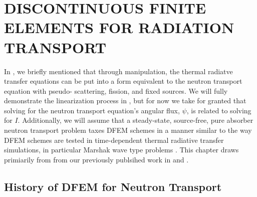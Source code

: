 %
%
%


\chapter{\uppercase {Discontinuous Finite Elements for Radiation Transport}}
\label{sec:chapter2_constant_xs}

In , we briefly mentioned that through manipulation, the thermal radiatve transfer equations can be put into a form equivalent to the 
neutron transport equation with pseudo- scattering, fission, and fixed sources.  
We will fully demonstrate the linearization process in , but for now we 
take for granted that solving for the neutron transport equation's angular flux, $\psi$, is related to solving  for $I$.
Additionally, we will assume that a steady-state, source-free, pure absorber neutron transport problem taxes DFEM schemes in a manner similar to the way DFEM schemes are tested
in time-dependent thermal radiative transfer simulations, in particular Marshak wave type problems \cite{ober_shadid}.  This chapter draws primiarily from
from our previously publsihed work in \cite{mc_2013} and \cite{part_1_paper}.

\section{History of DFEM for Neutron Transport}

